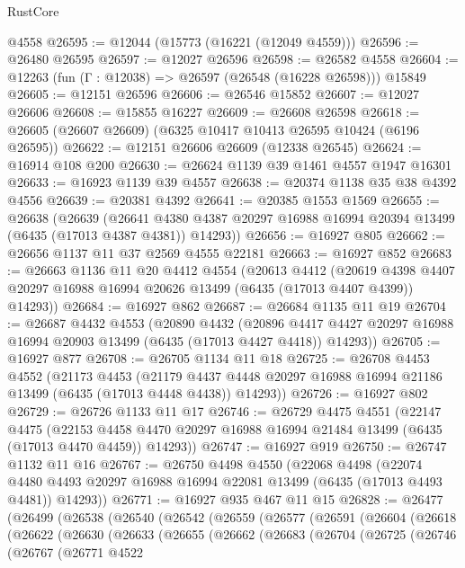 \begin{lexlean}{RustCore}
\begin{coremodule}
    @4558
@26595 := @12044 (@15773 (@16221 (@12049 @4559)))
@26596 := @26480 @26595
@26597 := @12027 @26596
@26598 := @26582 @4558
@26604 := @12263 (fun (Γ : @12038) => @26597 (@26548 (@16228 @26598))) @15849
@26605 := @12151 @26596
@26606 := @26546 @15852
@26607 := @12027 @26606
@26608 := @15855 @16227
@26609 := @26608 @26598
@26618 := @26605 (@26607 @26609) (@6325 @10417 @10413 @26595 @10424 (@6196 @26595))
@26622 := @12151 @26606 @26609 (@12338 @26545)
@26624 := @16914 @108 @200
@26630 := @26624 @1139 @39 @1461 @4557 @1947 @16301
@26633 := @16923 @1139 @39 @4557
@26638 := @20374 @1138 @35 @38 @4392 @4556
@26639 := @20381 @4392
@26641 := @20385 @1553 @1569
@26655 := @26638
    (@26639
      (@26641 @4380 @4387 @20297 @16988 @16994 @20394 @13499 (@6435 (@17013 @4387 @4381)) @14293))
@26656 := @16927 @805
@26662 := @26656 @1137 @11 @37 @2569 @4555 @22181
@26663 := @16927 @852
@26683 := @26663
    @1136
    @11
    @20
    @4412
    @4554
    (@20613
      @4412
      (@20619 @4398 @4407 @20297 @16988 @16994 @20626 @13499 (@6435 (@17013 @4407 @4399)) @14293))
@26684 := @16927 @862
@26687 := @26684 @1135 @11 @19
@26704 := @26687
    @4432
    @4553
    (@20890
      @4432
      (@20896 @4417 @4427 @20297 @16988 @16994 @20903 @13499 (@6435 (@17013 @4427 @4418)) @14293))
@26705 := @16927 @877
@26708 := @26705 @1134 @11 @18
@26725 := @26708
    @4453
    @4552
    (@21173
      @4453
      (@21179 @4437 @4448 @20297 @16988 @16994 @21186 @13499 (@6435 (@17013 @4448 @4438)) @14293))
@26726 := @16927 @802
@26729 := @26726 @1133 @11 @17
@26746 := @26729
    @4475
    @4551
    (@22147
      @4475
      (@22153 @4458 @4470 @20297 @16988 @16994 @21484 @13499 (@6435 (@17013 @4470 @4459)) @14293))
@26747 := @16927 @919
@26750 := @26747 @1132 @11 @16
@26767 := @26750
    @4498
    @4550
    (@22068
      @4498
      (@22074 @4480 @4493 @20297 @16988 @16994 @22081 @13499 (@6435 (@17013 @4493 @4481)) @14293))
@26771 := @16927 @935 @467 @11 @15
@26828 := @26477
    (@26499
      (@26538
        (@26540
          (@26542
            (@26559
              (@26577
                (@26591
                  (@26604
                    (@26618
                      (@26622
                        (@26630
                          (@26633
                            (@26655
                              (@26662
                                (@26683
                                  (@26704
                                    (@26725
                                      (@26746
                                        (@26767
                                          (@26771
                                            @4522

\end{coremodule}
\end{lexlean}
